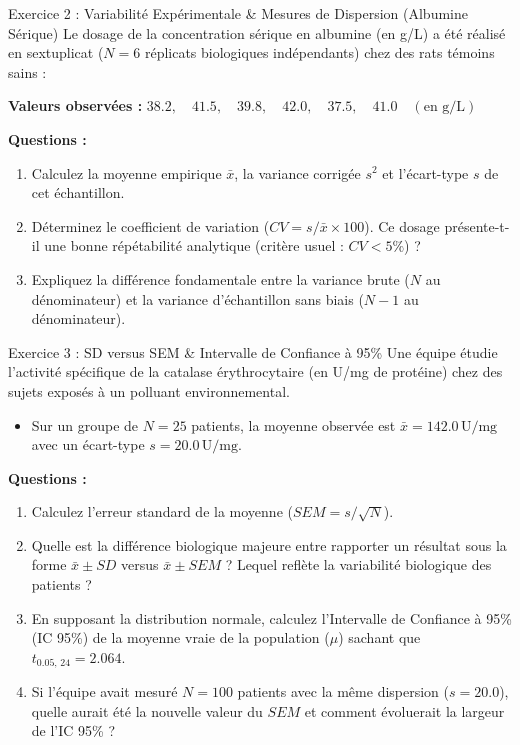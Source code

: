 \documentclass[11pt,a4paper]{article}
\begin{document}
\begin{exercicebox}{Exercice 2 : Variabilité Expérimentale \& Mesures de Dispersion (Albumine Sérique)}
Le dosage de la concentration sérique en albumine (en g/L) a été réalisé en sextuplicat ($N = 6$ réplicats biologiques indépendants) chez des rats témoins sains :
\begin{center}
  \textbf{Valeurs observées :} \quad $38.2, \quad 41.5, \quad 39.8, \quad 42.0, \quad 37.5, \quad 41.0 \quad (\text{en g/L})$
\end{center}

\textbf{Questions :}
\begin{enumerate}[label=\textbf{\alph*.}]
  \item Calculez la moyenne empirique $\bar{x}$, la variance corrigée $s^2$ et l'écart-type $s$ de cet échantillon.
  \item Déterminez le coefficient de variation ($CV = s / \bar{x} \times 100$). Ce dosage présente-t-il une bonne répétabilité analytique (critère usuel : $CV < 5\%$) ?
  \item Expliquez la différence fondamentale entre la variance brute ($N$ au dénominateur) et la variance d'échantillon sans biais ($N-1$ au dénominateur).
\end{enumerate}
\end{exercicebox}

\begin{exercicebox}{Exercice 3 : SD versus SEM \& Intervalle de Confiance à 95\%}
Une équipe étudie l'activité spécifique de la catalase érythrocytaire (en U/mg de protéine) chez des sujets exposés à un polluant environnemental.
\begin{itemize}
  \item Sur un groupe de $N = 25$ patients, la moyenne observée est $\bar{x} = 142.0\,\text{U/mg}$ avec un écart-type $s = 20.0\,\text{U/mg}$.
\end{itemize}

\textbf{Questions :}
\begin{enumerate}[label=\textbf{\alph*.}]
  \item Calculez l'erreur standard de la moyenne ($SEM = s / \sqrt{N}$).
  \item Quelle est la différence biologique majeure entre rapporter un résultat sous la forme $\bar{x} \pm SD$ versus $\bar{x} \pm SEM$ ? Lequel reflète la variabilité biologique des patients ?
  \item En supposant la distribution normale, calculez l'Intervalle de Confiance à 95\% (IC 95\%) de la moyenne vraie de la population ($\mu$) sachant que $t_{0.05, \, 24} = 2.064$.
  \item Si l'équipe avait mesuré $N = 100$ patients avec la même dispersion ($s=20.0$), quelle aurait été la nouvelle valeur du $SEM$ et comment évoluerait la largeur de l'IC 95\% ?
\end{enumerate}
\end{exercicebox}
\end{document}
